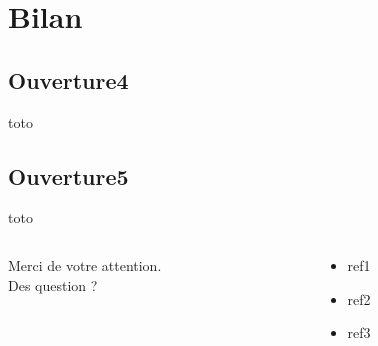 \documentclass{beamer}
\begin{document}
\section{Bilan}
\subsection{Ouverture4}
\begin{frame}
	toto
\end{frame}
\subsection{Ouverture5}
\begin{frame}
	toto
\end{frame}

\begin{frame}
	\begin{columns}[T] %
		\begin{column}{.48\textwidth}
			\begin{center}
				Merci de votre attention.\\
				Des question ?
			\end{center}
		\end{column}%
		\hfill%
		\begin{column}{.48\textwidth}
			\begin{itemize}
			 	\item ref1
			 	\item ref2
			 	\item ref3
			\end{itemize}
		\end{column}%
	\end{columns}
\end{frame}
\end{document}

